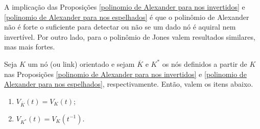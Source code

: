 	A implicação das Proposições \ref{polinomio de Alexander para nos invertidos} 
	e \ref{polinomio de Alexander para nos espelhados} é que o polinômio de Alexander 
	não é forte o suficiente para detectar ou não se um dado nó é aquiral nem invertível. 
	Por outro lado, para o polinômio de Jones valem resultados similares, mas mais fortes.
	\begin{theorem}
	\label{polinomio de Jones para nos espelhados e invertidos}
		Seja $K$ um nó (ou link) orientado e sejam $\overline{K}$ e $K^\ast$ os nós 
		definidos a partir de $K$ nas Proposições \ref{polinomio de Alexander para nos invertidos} 
		e \ref{polinomio de Alexander para nos espelhados}, respectivamente. Então, valem os itens abaixo.
		\begin{enumerate}
			\item $V_{\overline{K}}(t) = V_K(t)$;
			\item $V_{K^\ast}(t) = V_K(t^{-1})$.
		\end{enumerate}
	\end{theorem}
